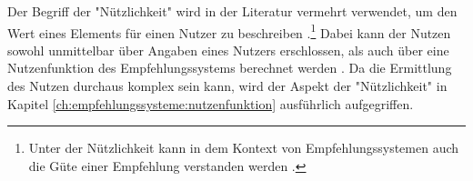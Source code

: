 Der Begriff der "Nützlichkeit" wird in der Literatur vermehrt verwendet, um den Wert eines Elements für einen Nutzer zu beschreiben \cite[S. 10f]{ricci:book}\cite[S. 1]{klahold:book}\cite[S. 735]{adomavicius:inproceedings}.\footnote{Unter der Nützlichkeit kann in dem Kontext von Empfehlungssystemen auch die Güte einer Empfehlung verstanden werden \cite[S. 37ff]{klahold:book}.}
Dabei kann der Nutzen sowohl unmittelbar über Angaben eines Nutzers erschlossen, als auch über eine Nutzenfunktion des Empfehlungssystems berechnet werden \cite[S. 735]{adomavicius:inproceedings}.
Da die Ermittlung des Nutzen durchaus komplex sein kann, wird der Aspekt der "Nützlichkeit" in Kapitel \ref{ch:empfehlungssysteme:nutzenfunktion} ausführlich aufgegriffen.

